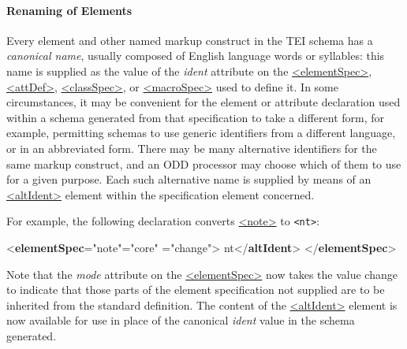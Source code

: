 \paragraph[{Renaming of Elements}]{Renaming of Elements}\label{MDMDNM}\par
Every element and other named markup construct in the TEI schema has a \textit{canonical name}, usually composed of English language words or syllables: this name is supplied as the value of the {\itshape ident} attribute on the \hyperref[TEI.elementSpec]{<elementSpec>}, \hyperref[TEI.attDef]{<attDef>}, \hyperref[TEI.classSpec]{<classSpec>}, or \hyperref[TEI.macroSpec]{<macroSpec>} used to define it. In some circumstances, it may be convenient for the element or attribute declaration used within a schema generated from that specification to take a different form, for example, permitting schemas to use generic identifiers from a different language, or in an abbreviated form. There may be many alternative identifiers for the same markup construct, and an ODD processor may choose which of them to use for a given purpose. Each such alternative name is supplied by means of an \hyperref[TEI.altIdent]{<altIdent>} element within the specification element concerned.\par
For example, the following declaration converts \hyperref[TEI.note]{<note>} to \texttt{<nt>}: \par\bgroup{}\exampleFont \begin{shaded}\noindent\mbox{}{<\textbf{elementSpec}\hspace*{1em}{ident}="{note}"\hspace*{1em}{module}="{core}"\mbox{}\newline 
\hspace*{1em}{mode}="{change}">}\mbox{}\newline 
{}nt{</\textbf{altIdent}>}\mbox{}\newline 
{</\textbf{elementSpec}>}\end{shaded}\egroup\par \noindent  Note that the {\itshape mode} attribute on the \hyperref[TEI.elementSpec]{<elementSpec>} now takes the value change to indicate that those parts of the element specification not supplied are to be inherited from the standard definition. The content of the \hyperref[TEI.altIdent]{<altIdent>} element is now available for use in place of the canonical {\itshape ident} value in the schema generated.\par
